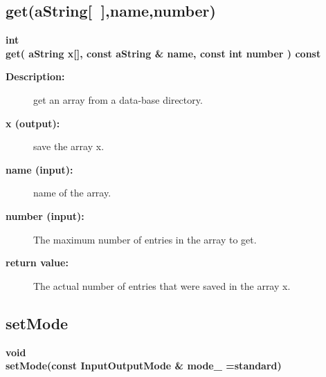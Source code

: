 \subsection{get(aString[~],name,number) }
 
\begin{flushleft} \textbf{%
int  \\ 
\settowidth{\GenericDataBaseIncludeArgIndent}{get(}%
get( aString x[], const aString \& name, const int number ) const
}\end{flushleft}
    
\begin{description}
\item[{\bf Description:}]  get an array from a data-base directory.
\item[{\bf x (output):}]  save the array x.
\item[{\bf name (input):}]  name of the array.
\item[{\bf number (input):}]  The maximum number of entries in the array to get.
\item[{\bf return value:}]  The actual number of entries that were saved in the array x.

\end{description}
\subsection{setMode}
 
\begin{flushleft} \textbf{%
void  \\ 
\settowidth{\GenericDataBaseIncludeArgIndent}{setMode(}%
setMode(const InputOutputMode \& mode\_  =standard)
}\end{flushleft}
    
